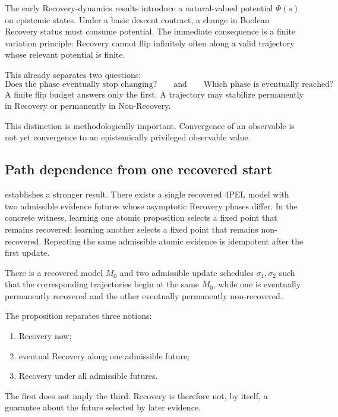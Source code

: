 The early Recovery-dynamics results introduce a natural-valued potential $\Phi(s)$ on epistemic states. Under a basic descent contract, a change in Boolean Recovery status must consume potential. The immediate consequence is a finite variation principle: Recovery cannot flip infinitely often along a valid trajectory whose relevant potential is finite.

This already separates two questions:
\[
\text{Does the phase eventually stop changing?}
\qquad\text{and}\qquad
\text{Which phase is eventually reached?}
\]
A finite flip budget answers only the first. A trajectory may stabilize permanently in Recovery or permanently in Non-Recovery.

This distinction is methodologically important. Convergence of an observable is not yet convergence to an epistemically privileged observable value.

\subsection{Path dependence from one recovered start}

 establishes a stronger result. There exists a single recovered 4PEL model with two admissible evidence futures whose asymptotic Recovery phases differ. In the concrete witness, learning one atomic proposition selects a fixed point that remains recovered; learning another selects a fixed point that remains non-recovered. Repeating the same admissible atomic evidence is idempotent after the first update.

\begin{proposition}
There is a recovered model $M_0$ and two admissible update schedules $\sigma_1,\sigma_2$ such that the corresponding trajectories begin at the same $M_0$, while one is eventually permanently recovered and the other eventually permanently non-recovered.
\end{proposition}

The proposition separates three notions:
\begin{enumerate}
  \item Recovery now;
  \item eventual Recovery along one admissible future;
  \item Recovery under all admissible futures.
\end{enumerate}
The first does not imply the third. Recovery is therefore not, by itself, a guarantee about the future selected by later evidence.

